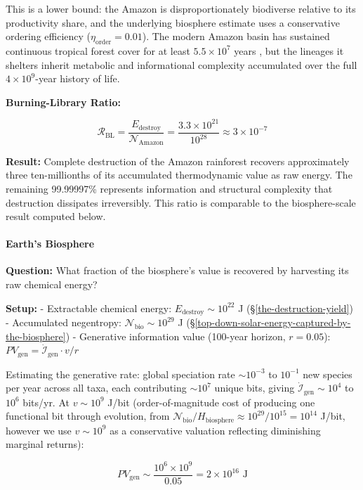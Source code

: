 \documentclass[11pt]{article}
\theoremstyle{plain}
\theoremstyle{definition}
\theoremstyle{remark}
\let\origparagraphcmd\paragraph
\renewcommand{\paragraph}{\needspace{3\baselineskip}\origparagraphcmd}
\begin{document}
This is a lower bound: the Amazon is disproportionately biodiverse
relative to its productivity share, and the underlying biosphere
estimate uses a conservative ordering efficiency
(\(\eta_{\text{order}} = 0.01\)). The modern Amazon basin has sustained
continuous tropical forest cover for at least \(5.5 \times 10^7\) years
\citep{Morley2000}, but the lineages it shelters inherit metabolic and
informational complexity accumulated over the full
\(4 \times 10^9\)-year history of life.

\textbf{Burning-Library Ratio:}

\[\mathcal{R}_{\text{BL}} = \frac{E_{\text{destroy}}}{\mathcal{N}_{\text{Amazon}}} = \frac{3.3 \times 10^{21}}{10^{28}} \approx 3 \times 10^{-7}\]

\textbf{Result:} Complete destruction of the Amazon rainforest recovers
approximately three ten-millionths of its accumulated thermodynamic
value as raw energy. The remaining 99.99997\% represents information and
structural complexity that destruction dissipates irreversibly. This
ratio is comparable to the biosphere-scale result computed below.

\paragraph{Earth's Biosphere}\label{earths-biosphere}

\textbf{Question:} What fraction of the biosphere's value is recovered
by harvesting its raw chemical energy?

\textbf{Setup:} - Extractable chemical energy:
\(E_{\text{destroy}} \sim 10^{22}\) J (§\ref{the-destruction-yield}) -
Accumulated negentropy: \(\mathcal{N}_{\text{bio}} \sim 10^{29}\) J
(§\ref{top-down-solar-energy-captured-by-the-biosphere}) - Generative
information value (100-year horizon, \(r = 0.05\)):
\(PV_{\text{gen}} = \dot{\mathcal{I}}_{\text{gen}} \cdot v / r\)

Estimating the generative rate: global speciation rate \(\sim 10^{-3}\)
to \(10^{-1}\) new species per year across all taxa, each contributing
\(\sim 10^7\) unique bits, giving
\(\dot{\mathcal{I}}_{\text{gen}} \sim 10^4\) to \(10^6\) bits/yr. At
\(v \sim 10^9\) J/bit (order-of-magnitude cost of producing one
functional bit through evolution, from
\(\mathcal{N}_{\text{bio}} / H_{\text{biosphere}} \approx 10^{29}/10^{15} = 10^{14}\)
J/bit, however we use \(v \sim 10^9\) as a conservative valuation
reflecting diminishing marginal returns):

\[PV_{\text{gen}} \sim \frac{10^6 \times 10^9}{0.05} = 2 \times 10^{16} \text{ J}\]
\end{document}
